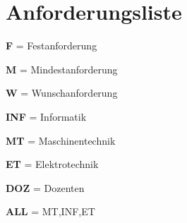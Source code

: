 \section{Anforderungsliste}

\begin{items}
  \item {\bf F} = Festanforderung
  \item {\bf M} = Mindestanforderung
  \item {\bf W} = Wunschanforderung
\end{items}

\begin{items}
  \item {\bf INF} = Informatik
  \item {\bf MT} = Maschinentechnik
  \item {\bf ET} = Elektrotechnik
  \item {\bf DOZ} = Dozenten
  \item {\bf ALL} = MT,INF,ET
\end{items}

